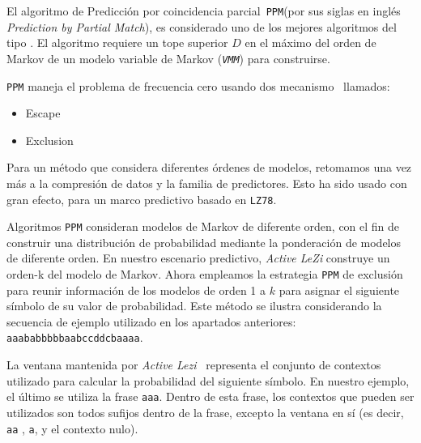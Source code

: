 


El algoritmo de Predicción por coincidencia parcial~\texttt{PPM}(por sus siglas en inglés \emph{Prediction by Partial Match}), es considerado uno de los mejores algoritmos del tipo \losslessdatacompression. El algoritmo requiere un tope superior $D$ en el máximo del orden de Markov de un modelo variable de Markov (\emph{\texttt{VMM}}) para construirse. 

\texttt{PPM} maneja el problema de frecuencia cero usando dos mecanismo~\cite{Begleiter2004} llamados:
	\begin{itemize}
		\menorEspacioItemize
		\item Escape
		\item Exclusion
	\end{itemize}
	
Para un método que considera diferentes órdenes de modelos, retomamos una vez más a la compresión de datos y la familia de predictores.  Esto ha sido usado con gran efecto, para un marco predictivo basado en \texttt{LZ78}. 

Algoritmos  \texttt{PPM} consideran modelos de Markov de diferente orden,  con el fin de construir una distribución de probabilidad mediante la ponderación de modelos de diferente orden. En nuestro escenario predictivo, \emph{Active LeZi} construye un orden-k del modelo de Markov. Ahora empleamos la estrategia \texttt{PPM} de exclusión para reunir información de los modelos de orden 1 a $k$ para asignar el siguiente símbolo de su valor de probabilidad. Este método se ilustra considerando la secuencia de ejemplo utilizado en los apartados anteriores: \texttt{aaababbbbbaabccddcbaaaa}.

La ventana mantenida por \emph{Active Lezi}~\cite{Gopalratnam2007} representa el conjunto de contextos utilizado para calcular la probabilidad  del siguiente símbolo. En nuestro ejemplo, el último se utiliza la frase \texttt{aaa}. Dentro de esta frase, los contextos que pueden ser utilizados son todos sufijos dentro de la frase, excepto la ventana en sí (es decir, \texttt{aa} , \texttt{a}, y el contexto nulo).

	
